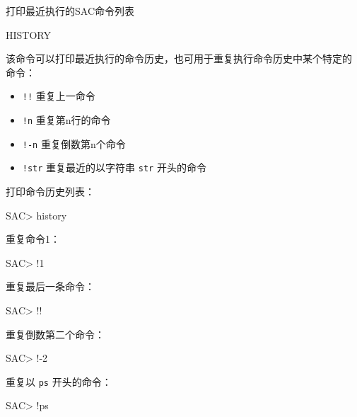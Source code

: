 \label{cmd:history}

打印最近执行的SAC命令列表

\begin{SACSTX}
HISTORY
\end{SACSTX}

该命令可以打印最近执行的命令历史，也可用于重复执行命令历史中某个特定的
命令：
\begin{itemize}
\item \texttt{!!} 重复上一命令
\item \texttt{!n} 重复第n行的命令
\item \texttt{!-n} 重复倒数第n个命令
\item \texttt{!str} 重复最近的以字符串 \texttt{str} 开头的命令
\end{itemize}

打印命令历史列表：
\begin{SACCode}
SAC> history
\end{SACCode}

重复命令1：
\begin{SACCode}
SAC> !1
\end{SACCode}

重复最后一条命令：
\begin{SACCode}
SAC> !!
\end{SACCode}

重复倒数第二个命令：
\begin{SACCode}
SAC> !-2
\end{SACCode}

重复以 \texttt{ps} 开头的命令：
\begin{SACCode}
SAC> !ps
\end{SACCode}
